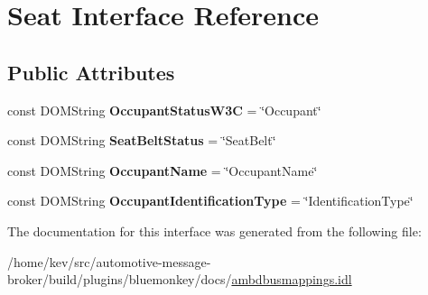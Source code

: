 \hypertarget{interfaceSeat}{\section{Seat Interface Reference}
\label{interfaceSeat}
}
\subsection*{Public Attributes}
\begin{DoxyCompactItemize}
\item 
\hypertarget{interfaceSeat_a9dfd71204222c0d59de76716120bff44}{const D\+O\+M\+String {\bfseries Occupant\+Status\+W3\+C} = \char`\"{}Occupant\char`\"{}}\label{interfaceSeat_a9dfd71204222c0d59de76716120bff44}

\item 
\hypertarget{interfaceSeat_a4ad0b531d1d20e3490f67ff56792a701}{const D\+O\+M\+String {\bfseries Seat\+Belt\+Status} = \char`\"{}Seat\+Belt\char`\"{}}\label{interfaceSeat_a4ad0b531d1d20e3490f67ff56792a701}

\item 
\hypertarget{interfaceSeat_afa5739cd2f418bbc28fa6a469706c8fa}{const D\+O\+M\+String {\bfseries Occupant\+Name} = \char`\"{}Occupant\+Name\char`\"{}}\label{interfaceSeat_afa5739cd2f418bbc28fa6a469706c8fa}

\item 
\hypertarget{interfaceSeat_aac8ae80e32ed167cfd9275692fb0cee1}{const D\+O\+M\+String {\bfseries Occupant\+Identification\+Type} = \char`\"{}Identification\+Type\char`\"{}}\label{interfaceSeat_aac8ae80e32ed167cfd9275692fb0cee1}

\end{DoxyCompactItemize}


The documentation for this interface was generated from the following file\+:\begin{DoxyCompactItemize}
\item 
/home/kev/src/automotive-\/message-\/broker/build/plugins/bluemonkey/docs/\hyperlink{ambdbusmappings_8idl}{ambdbusmappings.\+idl}\end{DoxyCompactItemize}

